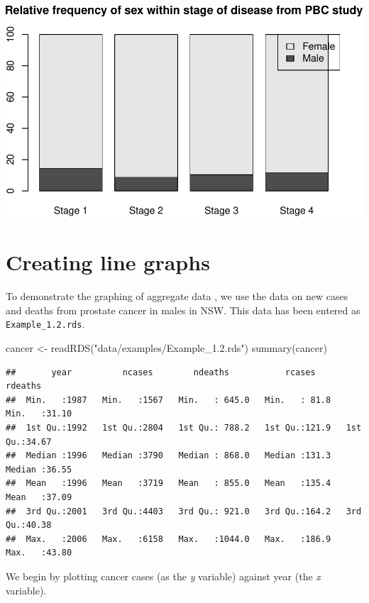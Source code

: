 \documentclass[
]{memoir}
\newenvironment{Shaded}{\begin{snugshade}}{\end{snugshade}}
\newcommand{\FunctionTok}[1]{\textcolor[rgb]{0.00,0.00,0.00}{#1}}
\newcommand{\NormalTok}[1]{#1}
\newcommand{\OtherTok}[1]{\textcolor[rgb]{0.56,0.35,0.01}{#1}}
\newcommand{\StringTok}[1]{\textcolor[rgb]{0.31,0.60,0.02}{#1}}
\begin{document}
\includegraphics{phcm9795-R-notes_files/figure-latex/unnamed-chunk-47-1.pdf}

\hypertarget{creating-line-graphs}{%
\section{Creating line graphs}\label{creating-line-graphs}}

To demonstrate the graphing of aggregate data , we use the data on new cases and deaths from prostate cancer in males in NSW. This data has been entered as \texttt{Example\_1.2.rds}.

\begin{Shaded}
\begin{Highlighting}[]
\NormalTok{cancer }\OtherTok{\textless{}{-}} \FunctionTok{readRDS}\NormalTok{(}\StringTok{"data/examples/Example\_1.2.rds"}\NormalTok{)}
\FunctionTok{summary}\NormalTok{(cancer)}
\end{Highlighting}
\end{Shaded}

\begin{verbatim}
##       year          ncases        ndeaths           rcases         rdeaths     
##  Min.   :1987   Min.   :1567   Min.   : 645.0   Min.   : 81.8   Min.   :31.10  
##  1st Qu.:1992   1st Qu.:2804   1st Qu.: 788.2   1st Qu.:121.9   1st Qu.:34.67  
##  Median :1996   Median :3790   Median : 868.0   Median :131.3   Median :36.55  
##  Mean   :1996   Mean   :3719   Mean   : 855.0   Mean   :135.4   Mean   :37.09  
##  3rd Qu.:2001   3rd Qu.:4403   3rd Qu.: 921.0   3rd Qu.:164.2   3rd Qu.:40.38  
##  Max.   :2006   Max.   :6158   Max.   :1044.0   Max.   :186.9   Max.   :43.80
\end{verbatim}

We begin by plotting cancer cases (as the \emph{y} variable) against year (the \emph{x} variable).
\end{document}
